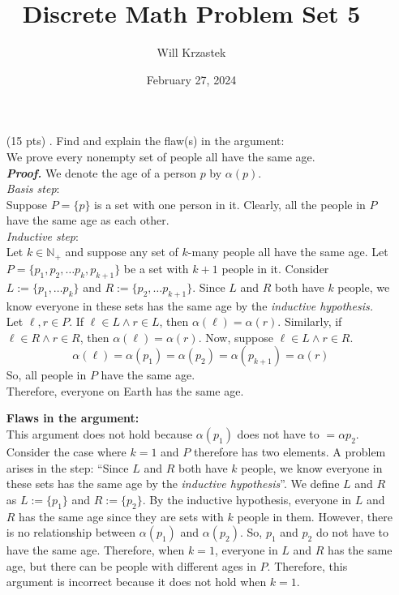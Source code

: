 \documentclass[11pt,a4paper]{article}
\begin{document}
 
\title{Discrete Math Problem Set 5}
\author{Will Krzastek}
\date{February 27, 2024}
\maketitle

\begin{enumerate}
    \item[(15 pts) \quad 1.]
    Find and explain the flaw(s) in the argument: \\
    We prove every nonempty set of people all have the same age. \\
    \emph{\textbf{Proof.}} We denote the age of a person $p$ by $\alpha(p)$. \\
    \emph{Basis step}: \\
    Suppose $P = \{{p}\}$ is a set with one person in it.
    Clearly, all the people in $P$ have the same age as each other. \\
    \emph{Inductive step}: \\
    Let $k \in \mathbb{N}_+$ and suppose any set of $k$-many people all have the same age.
    Let $P = \{p_1, p_2, \dots p_k, p_{k + 1}\}$ be a set with $k + 1$ people in it.
    Consider $L := \{p_1, \dots p_k\}$ and $R := \{p_2, \dots p_{k + 1}\}$.
    Since $L$ and $R$ both have $k$ people, we know everyone in these sets has the same age by the \emph{inductive hypothesis.} \\
    Let $\ell, r \in P$.
    If $\ell \in L \land r \in L$, then $\alpha(\ell) = \alpha(r)$.
    Similarly, if $\ell \in R \land r \in R$, then $\alpha(\ell) = \alpha(r)$.
    Now, suppose $\ell \in L \land r \in R$.
    \begin{equation*}
        \alpha(\ell) = \alpha(p_1) = \alpha(p_2) = \alpha(p_{k + 1}) = \alpha(r)
      \end{equation*}
      So, all people in $P$ have the same age. \\
      Therefore, everyone on Earth has the same age.
      
      \textbf{Flaws in the argument:} \\
      This argument does not hold because $\alpha(p_1) $ does not have to $= \alpha p_2 $. \\
      Consider the case where $k = 1$ and $P$ therefore has two elements. A problem arises in the step: ``Since $L$ and $R$ both have $k$ people, we know everyone in these sets has the same age by the \emph{inductive hypothesis}''.
      We define $L$ and $R$ as $L := \{p_1 \} $ and $R := \{p_2\} $. By the inductive hypothesis, everyone in $L$ and $R$ has the same age since they are sets with $k$ people in them.
      However, there is no relationship between $\alpha (p_1) $ and $\alpha (p_2)$. So, $p_1$ and $p_2$ do not have to have the same age. Therefore, when $k=1$, everyone in $ L$ and $R$ has the same age, but there can be people with different ages in $P$.
      Therefore, this argument is incorrect because it does not hold when $k=1$.  


\end{enumerate}
\end{document}
